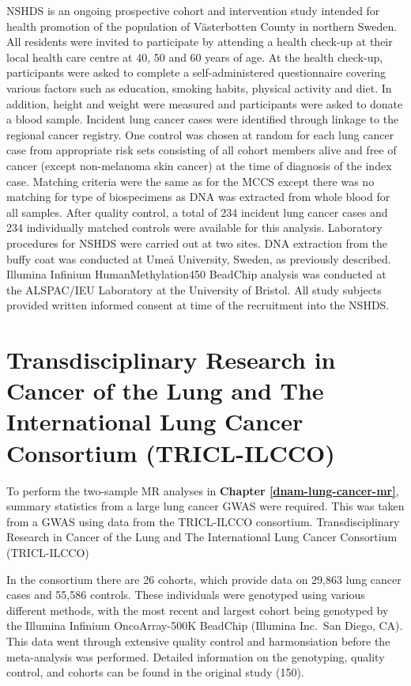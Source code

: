 \documentclass[11pt,twoside]{bristolthesis}
\begin{document}
NSHDS is an ongoing prospective cohort and intervention study intended for health promotion of the population of Västerbotten County in northern Sweden. All residents were invited to participate by attending a health check-up at their local health care centre at 40, 50 and 60 years of age. At the health check-up, participants were asked to complete a self-administered questionnaire covering various factors such as education, smoking habits, physical activity and diet. In addition, height and weight were measured and participants were asked to donate a blood sample. Incident lung cancer cases were identified through linkage to the regional cancer registry. One control was chosen at random for each lung cancer case from appropriate risk sets consisting of all cohort members alive and free of cancer (except non-melanoma skin cancer) at the time of diagnosis of the index case. Matching criteria were the same as for the MCCS except there was no matching for type of biospecimens as DNA was extracted from whole blood for all samples. After quality control, a total of 234 incident lung cancer cases and 234 individually matched controls were available for this analysis. Laboratory procedures for NSHDS were carried out at two sites. DNA extraction from the buffy coat was conducted at Umeå University, Sweden, as previously described. Illumina Infinium HumanMethylation450 BeadChip analysis was conducted at the ALSPAC/IEU Laboratory at the University of Bristol. All study subjects provided written informed consent at time of the recruitment into the NSHDS.

\hypertarget{tricl-ilcco-02}{%
\section{Transdisciplinary Research in Cancer of the Lung and The International Lung Cancer Consortium (TRICL-ILCCO)}\label{tricl-ilcco-02}}

To perform the two-sample MR analyses in \textbf{Chapter \ref{dnam-lung-cancer-mr}}, summary statistics from a large lung cancer GWAS were required. This was taken from a GWAS using data from the TRICL-ILCCO consortium. Transdisciplinary Research in Cancer of the Lung and The International Lung Cancer Consortium (TRICL-ILCCO)

In the consortium there are 26 cohorts, which provide data on 29,863 lung cancer cases and 55,586 controls. These individuals were genotyped using various different methods, with the most recent and largest cohort being genotyped by the Illumina Infinium OncoArray-500K BeadChip (Illumina Inc.~San Diego, CA). This data went through extensive quality control and harmonsiation before the meta-analysis was performed. Detailed information on the genotyping, quality control, and cohorts can be found in the original study (150).
\end{document}
